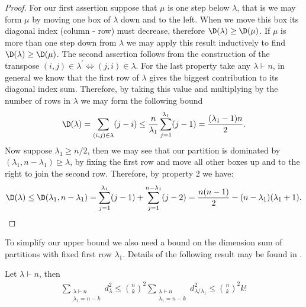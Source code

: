 \documentclass[11pt]{report}
\begin{document}
\begin{proof}
	For our first assertion suppose that $\mu$ is one step below $\lambda$, 
	that is we may form $\mu$ by moving one box of $\lambda$ down and to 
	the left. When we move this box its diagonal index (column - row) must decrease, 
	therefore $\D(\lambda) \geq \D(\mu)$. If $\mu$ is more than one step 
	down from $\lambda$ we may apply this result inductively to find 
	$\D(\lambda) \geq \D(\mu)$.
	The second assertion follows from the construction of the transpose  $(i,j) \in \lambda^{\prime} 
	\Leftrightarrow (j,i) \in \lambda$.
	For the last property take any $\lambda \vdash n$, in general we 
	know that the first row of $\lambda$ gives 
	the biggest contribution to its diagonal index sum. Therefore, by taking 
	this value and multiplying by the number of rows in $\lambda$ we may 
	form the following bound
	\[\D(\lambda) = \sum_{(i,j) \in \lambda} (j-i) \leq 
	\frac{n}{\lambda_{1}} \sum_{j=1}^{\lambda_{1}} (j-1) = 
	\frac{(\lambda_{1}-1)n}{2} .\]
	Now suppose $\lambda_{1} \geq n/2$, then we may see that our partition 
	is dominated by $(\lambda_{1}, 
	n-\lambda_{1}) \trianglerighteq \lambda$, by fixing the first row and move all other boxes up and to the right to join the second row.  Therefore, by property 2 we 
	have:
	\[\D(\lambda) \leq \D(\lambda_{1}, 
	n-\lambda_{1}) = \sum_{j=1}^{\lambda_{1}} (j-1) + 
	\sum_{j=1}^{n-\lambda_{1}} (j-2) = \frac{n(n-1)}{2} - 
	(n-\lambda_{1})(\lambda_{1}+1). \qedhere \]
\end{proof}
To simplify our upper bound we also need a bound on the dimension sum of partitions with fixed first row $\lambda_{1}$. Details of the following result may be found in \cite[Chapter 3D]{Diaconis1988}.
\begin{lemma}
	\label{chpt4:lem:youngdimbound}
	Let $\lambda \vdash n$, then
	\begin{eqnarray}
	\sum_{\substack{\lambda \vdash n \\ \lambda_{1} = n-k}} d_{\lambda}^{2} 
	\leq {n\choose k}^{2} \sum_{\substack{\lambda \vdash n \\ \lambda_{1} = 
			n-k}} d_{\lambda / \lambda_{1}}^{2} \leq {n\choose k}^{2} k!
	\label{chpt4:eqn:youngdimbound}
	\end{eqnarray}
\end{lemma}
\end{document}
